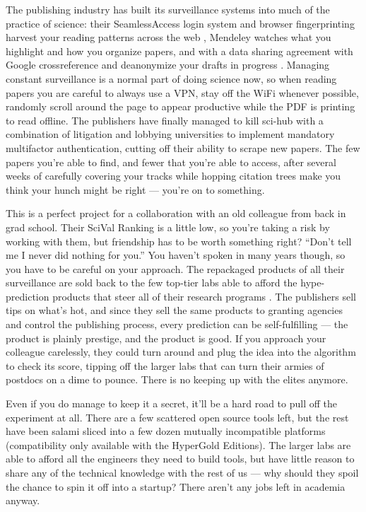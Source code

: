 The publishing industry has built its surveillance systems into much of
the practice of science: their SeamlessAccess login system and browser
fingerprinting harvest your reading patterns across the web\citep{sariGuestPostTechnology2018, brembsSNSINewPRISM2020, nisoNISORP272019Recommended2019, snsiCybersecurityLandscapeProtecting2020, SeamlessAccessActionSeamlessAccess} , Mendeley watches what you
highlight and how you organize papers, and with a data sharing agreement
with Google crossreference and deanonymize your drafts in progress \citep{pooleySurveillancePublishing2021} . Managing constant
surveillance is a normal part of doing science now, so when reading
papers you are careful to always use a VPN, stay off the WiFi whenever
possible, randomly scroll around the page to appear productive while the
PDF is printing to read offline. The publishers have finally managed to
kill sci-hub with a combination of litigation and lobbying universities
to implement mandatory multifactor authentication, cutting off their
ability to scrape new papers. The few papers you're able to find, and
fewer that you're able to access, after several weeks of carefully
covering your tracks while hopping citation trees make you think your
hunch might be right --- you're on to something.

This is a perfect project for a collaboration with an old colleague from
back in grad school. Their SciVal Ranking is a little low, so you're
taking a risk by working with them, but friendship has to be worth
something right? ``Don't tell me I never did nothing for you.'' You
haven't spoken in many years though, so you have to be careful on your
approach. The repackaged products of all their surveillance are sold
back to the few top-tier labs able to afford the hype-prediction
products that steer all of their research programs \citep{lifesciencesprofessionalservicesEmergingTrendsPancreatitis2021, elsevierTopicProminenceScience} . The publishers sell tips on what's
hot, and since they sell the same products to granting agencies and
control the publishing process, every prediction can be self-fulfilling
--- the product is plainly prestige, and the product is good. If you
approach your colleague carelessly, they could turn around and plug the
idea into the algorithm to check its score, tipping off the larger labs
that can turn their armies of postdocs on a dime to pounce. There is no
keeping up with the elites anymore.

Even if you do manage to keep it a secret, it'll be a hard road to pull
off the experiment at all. There are a few scattered open source tools
left, but the rest have been salami sliced into a few dozen mutually
incompatible platforms (compatibility only available with the HyperGold
Editions). The larger labs are able to afford all the engineers they
need to build tools, but have little reason to share any of the
technical knowledge with the rest of us --- why should they spoil the
chance to spin it off into a startup? There aren't any jobs left in
academia anyway.

